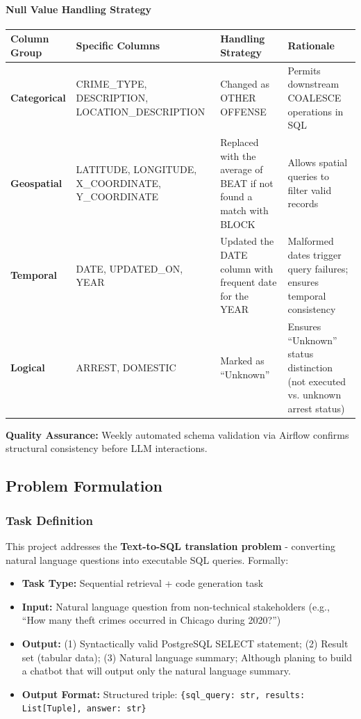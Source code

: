 \documentclass{article}
\begin{document}
\paragraph{Null Value Handling Strategy}
\noindent 
\begin{table}[h]
    \centering
    \small
    \begin{tabularx}{\textwidth}{|l|X|X|X|}
        \hline
        \textbf{Column Group} & \textbf{Specific Columns} & \textbf{Handling Strategy} & \textbf{Rationale} \\ \hline
        \textbf{Categorical} & CRIME\_TYPE, DESCRIPTION, LOCATION\_DESCRIPTION & Changed as OTHER OFFENSE & Permits downstream COALESCE operations in SQL\\ \hline
        \textbf{Geospatial} & LATITUDE, LONGITUDE, X\_COORDINATE, Y\_COORDINATE & Replaced with the average of BEAT if not found a match with BLOCK  &  Allows spatial queries to filter valid records \\ \hline
        \textbf{Temporal} & DATE, UPDATED\_ON, YEAR & Updated the DATE column with frequent date for the YEAR & Malformed dates trigger query failures; ensures temporal consistency \\ \hline
        \textbf{Logical} & ARREST, DOMESTIC & Marked as ``Unknown'' & Ensures ``Unknown'' status distinction (not executed vs. unknown arrest status) \\ \hline
    \end{tabularx}
\end{table}

\noindent \textbf{Quality Assurance:} Weekly automated schema validation via Airflow confirms structural consistency before LLM interactions.

\subsection{Problem Formulation}

\subsubsection{Task Definition}
This project addresses the \textbf{Text-to-SQL translation problem} - converting natural language questions into executable SQL queries. Formally:

\begin{itemize}
  \item \textbf{Task Type:} Sequential retrieval + code generation task
  \item \textbf{Input:} Natural language question from non-technical stakeholders (e.g., ``How many theft crimes occurred in Chicago during 2020?'')
  \item \textbf{Output:} (1) Syntactically valid PostgreSQL SELECT statement; (2) Result set (tabular data); (3) Natural language summary; Although planing to build a chatbot that will output only the natural language summary.
  \item \textbf{Output Format:} Structured triple: \texttt{\{sql\_query: str, results: List[Tuple], answer: str\}}
\end{itemize}
\end{document}
